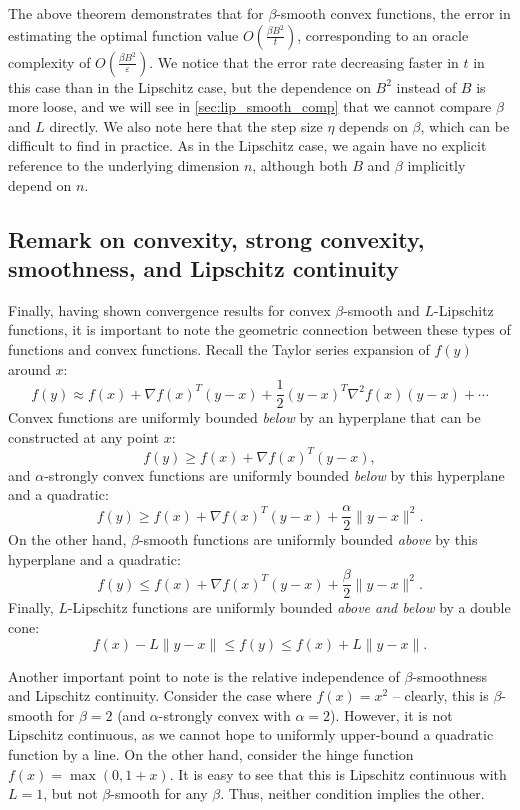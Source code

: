 The above theorem demonstrates that for $\beta$-smooth convex functions, the error in estimating the optimal function value $O\left(\frac{\beta B^2}{t}\right)$, corresponding to an oracle complexity of $O\left(\frac{\beta B^2}{\varepsilon}\right)$. We notice that the error rate decreasing faster in $t$ in this case than in the Lipschitz case, but the dependence on $B^2$ instead of $B$ is more loose, and we will see in \autoref{sec:lip_smooth_comp} that we cannot compare $\beta$ and $L$ directly. We also note here that the step size $\eta$ depends on $\beta$, which can be difficult to find in practice. As in the Lipschitz case, we again have no explicit reference to the underlying dimension $n$, although both $B$ and $\beta$ implicitly depend on $n$.

\subsection{Remark on convexity, strong convexity, smoothness, and Lipschitz continuity} \label{sec:lip_smooth_comp}
Finally, having shown convergence results for convex $\beta$-smooth and $L$-Lipschitz functions, it is important to note the geometric connection between these types of functions and convex functions. Recall the Taylor series expansion of $f(y)$ around $x$:
\[
f(y) \approx f(x) + \nabla f(x)^T (y - x) + \frac{1}{2} (y - x)^T \nabla^2 f(x) (y - x) + \cdots
\]
Convex functions are uniformly bounded \emph{below} by an hyperplane that can be constructed at any point $x$:
\[
f(y) \geq f(x) + \nabla f(x)^T (y - x),
\]
and $\alpha$-strongly convex functions are uniformly bounded \emph{below} by this hyperplane and a quadratic:
\[
f(y) \geq f(x) + \nabla f(x)^T (y - x) + \frac{\alpha}{2} \| y - x \|^2.
\]
On the other hand, $\beta$-smooth functions are uniformly bounded \emph{above} by this hyperplane and a quadratic:
\[
f(y) \leq f(x) + \nabla f(x)^T (y - x) + \frac{\beta}{2} \| y - x \|^2.
\]
Finally, $L$-Lipschitz functions are uniformly bounded \emph{above and below} by a double cone:
\[
f(x) - L \| y - x \| \le f(y) \leq f(x) + L \| y - x \|.
\]

Another important point to note is the relative independence of $\beta$-smoothness and Lipschitz continuity. Consider the case where $f(x) = x^2$ -- clearly, this is $\beta$-smooth for $\beta = 2$ (and $\alpha$-strongly convex with $\alpha=2$). However, it is not Lipschitz continuous, as we cannot hope to uniformly upper-bound a quadratic function by a line. On the other hand, consider the hinge function $f(x) = \max(0, 1 + x)$. It is easy to see that this is Lipschitz continuous with $L = 1$, but not $\beta$-smooth for any $\beta$. Thus, neither condition implies the other.


